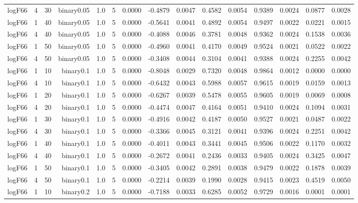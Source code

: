 \begin{longtable}{rrrrrrrrrrrrrrr}
  logF66 & 4 & 30 & binary0.05 & 1.0 & 5 & 0.0000 & -0.4879 & 0.0047 & 0.4582 & 0.0054 & 0.9389 & 0.0024 & 0.0877 & 0.0028 \\ 
  logF66 & 1 & 40 & binary0.05 & 1.0 & 5 & 0.0000 & -0.5641 & 0.0041 & 0.4892 & 0.0054 & 0.9497 & 0.0022 & 0.0221 & 0.0015 \\ 
  logF66 & 4 & 40 & binary0.05 & 1.0 & 5 & 0.0000 & -0.4088 & 0.0046 & 0.3781 & 0.0048 & 0.9362 & 0.0024 & 0.1538 & 0.0036 \\ 
  logF66 & 1 & 50 & binary0.05 & 1.0 & 5 & 0.0000 & -0.4960 & 0.0041 & 0.4170 & 0.0049 & 0.9524 & 0.0021 & 0.0522 & 0.0022 \\ 
  logF66 & 4 & 50 & binary0.05 & 1.0 & 5 & 0.0000 & -0.3408 & 0.0044 & 0.3104 & 0.0041 & 0.9388 & 0.0024 & 0.2255 & 0.0042 \\ 
  logF66 & 1 & 10 & binary0.1 & 1.0 & 5 & 0.0000 & -0.8048 & 0.0029 & 0.7320 & 0.0048 & 0.9864 & 0.0012 & 0.0000 & 0.0000 \\ 
  logF66 & 4 & 10 & binary0.1 & 1.0 & 5 & 0.0000 & -0.6432 & 0.0043 & 0.5988 & 0.0057 & 0.9615 & 0.0019 & 0.0159 & 0.0013 \\ 
  logF66 & 1 & 20 & binary0.1 & 1.0 & 5 & 0.0000 & -0.6267 & 0.0039 & 0.5478 & 0.0055 & 0.9605 & 0.0019 & 0.0069 & 0.0008 \\ 
  logF66 & 4 & 20 & binary0.1 & 1.0 & 5 & 0.0000 & -0.4474 & 0.0047 & 0.4164 & 0.0051 & 0.9410 & 0.0024 & 0.1094 & 0.0031 \\ 
  logF66 & 1 & 30 & binary0.1 & 1.0 & 5 & 0.0000 & -0.4916 & 0.0042 & 0.4187 & 0.0050 & 0.9527 & 0.0021 & 0.0487 & 0.0022 \\ 
  logF66 & 4 & 30 & binary0.1 & 1.0 & 5 & 0.0000 & -0.3366 & 0.0045 & 0.3121 & 0.0041 & 0.9396 & 0.0024 & 0.2251 & 0.0042 \\ 
  logF66 & 1 & 40 & binary0.1 & 1.0 & 5 & 0.0000 & -0.4011 & 0.0043 & 0.3441 & 0.0045 & 0.9506 & 0.0022 & 0.1170 & 0.0032 \\ 
  logF66 & 4 & 40 & binary0.1 & 1.0 & 5 & 0.0000 & -0.2672 & 0.0041 & 0.2436 & 0.0033 & 0.9405 & 0.0024 & 0.3425 & 0.0047 \\ 
  logF66 & 1 & 50 & binary0.1 & 1.0 & 5 & 0.0000 & -0.3405 & 0.0042 & 0.2891 & 0.0038 & 0.9479 & 0.0022 & 0.1878 & 0.0039 \\ 
  logF66 & 4 & 50 & binary0.1 & 1.0 & 5 & 0.0000 & -0.2214 & 0.0039 & 0.1990 & 0.0028 & 0.9415 & 0.0023 & 0.4519 & 0.0050 \\ 
  logF66 & 1 & 10 & binary0.2 & 1.0 & 5 & 0.0000 & -0.7188 & 0.0033 & 0.6285 & 0.0052 & 0.9729 & 0.0016 & 0.0001 & 0.0001 \\ 

\end{longtable}
